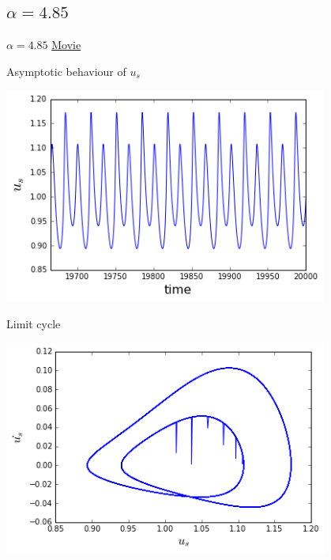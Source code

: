 \documentclass{beamer}
\begin{document}
\subsection{$\alpha = 4.85$}
\begin{frame}{$\alpha = 4.85$}
\href{https://www.youtube.com/watch?v=0V0PySj1DOE}{Movie} 
\end{frame}
\begin{frame}{Asymptotic behaviour of $u_s$}
  \begin{center}
  	\includegraphics[height=200pt]{485}\\
  	
  \end{center}	
\end{frame}
\begin{frame}{Limit cycle}
	\begin{center}
		\includegraphics[height=200pt]{lim485}\\
		
	\end{center}	
\end{frame}
\end{document}
